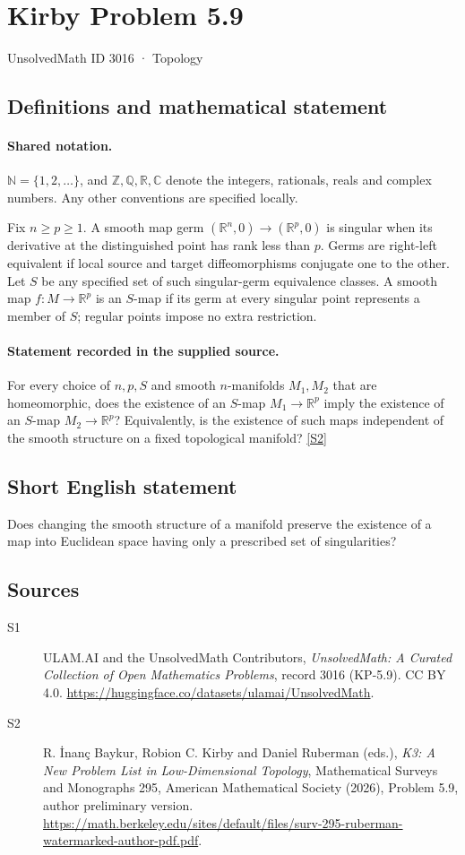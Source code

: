 \documentclass[11pt]{article}
\newcommand{\sref}[2]{\hyperlink{source:#1:#2}{[S#2]}}
\begin{document}
\setcounter{section}{3015}
\section{Kirby Problem 5.9}\label{3016}
{\small\sffamily UnsolvedMath ID 3016 · Topology}
\subsection{Definitions and mathematical statement}

\paragraph{Shared notation.}$\mathbb N=\{1,2,\ldots\}$, and $\mathbb Z,\mathbb Q,\mathbb R,\mathbb C$ denote the integers, rationals, reals and complex numbers. Any other conventions are specified locally.


Fix $n\geq p\geq1$. A smooth map germ $(\mathbb R^n,0)\to(\mathbb R^p,0)$ is singular when its derivative at the distinguished point has rank less than $p$. Germs are right-left equivalent if local source and target diffeomorphisms conjugate one to the other. Let $S$ be any specified set of such singular-germ equivalence classes. A smooth map $f:M\to\mathbb R^p$ is an $S$-map if its germ at every singular point represents a member of $S$; regular points impose no extra restriction.
\paragraph{Statement recorded in the supplied source.}
For every choice of $n,p,S$ and smooth $n$-manifolds $M_1,M_2$ that are homeomorphic, does the existence of an $S$-map $M_1\to\mathbb R^p$ imply the existence of an $S$-map $M_2\to\mathbb R^p$? Equivalently, is the existence of such maps independent of the smooth structure on a fixed topological manifold? \sref{3016}{2}
\subsection{Short English statement}
Does changing the smooth structure of a manifold preserve the existence of a map into Euclidean space having only a prescribed set of singularities?
\subsection{Sources}
\begin{description}
\item[\hypertarget{source:3016:1}{S1}] ULAM.AI and the UnsolvedMath Contributors, \emph{UnsolvedMath: A Curated Collection of Open Mathematics Problems}, record 3016 (KP-5.9). CC BY 4.0. \url{https://huggingface.co/datasets/ulamai/UnsolvedMath}.
\item[\hypertarget{source:3016:2}{S2}] R. İnanç Baykur, Robion C. Kirby and Daniel Ruberman (eds.), \emph{K3: A New Problem List in Low-Dimensional Topology}, Mathematical Surveys and Monographs 295, American Mathematical Society (2026), Problem 5.9, author preliminary version. \url{https://math.berkeley.edu/sites/default/files/surv-295-ruberman-watermarked-author-pdf.pdf}.
\end{description}
\label{end:3016}
\end{document}

